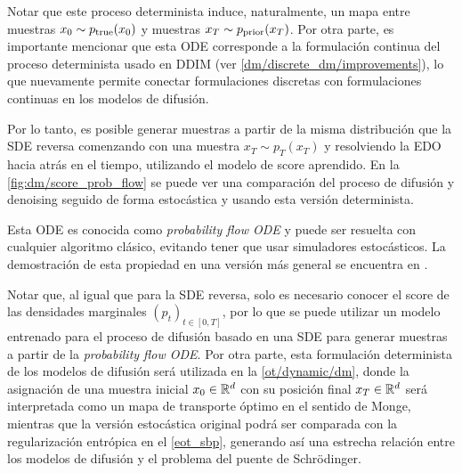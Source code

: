 Notar que este proceso determinista induce, naturalmente, un mapa  entre muestras $x_0\sim p_{\operatorname{true}}(x_0)$ y muestras $x_T\sim p_{\operatorname{prior}}(x_T)$. Por otra parte, es importante mencionar que esta ODE corresponde a la formulación continua del proceso determinista usado en DDIM (ver \autoref{dm/discrete_dm/improvements}), lo que nuevamente permite conectar formulaciones discretas con formulaciones continuas en los modelos de difusión.

Por lo tanto, es posible generar muestras a partir de la misma distribución que la SDE reversa comenzando con una muestra $x_T\sim p_T(x_T)$ y resolviendo la EDO hacia atrás en el tiempo, utilizando el modelo de score aprendido. En la \autoref{fig:dm/score_prob_flow} se puede ver una comparación del proceso de difusión y denoising seguido de forma estocástica y usando esta versión determinista.


Esta ODE es conocida como \textit{probability flow ODE} y puede ser resuelta con cualquier algoritmo clásico, evitando tener que usar simuladores estocásticos. La demostración de esta propiedad en una versión más general se encuentra en \cite{song2021scorebased}.

Notar que, al igual que para la SDE reversa, solo es necesario conocer el score de las densidades marginales $(p_t)_{t\in[0,T]}$, por lo que se puede utilizar un modelo entrenado para el proceso de difusión basado en una SDE para generar muestras a partir de la \textit{probability flow ODE}. Por otra parte, esta formulación determinista de los modelos de difusión será utilizada en la \autoref{ot/dynamic/dm}, donde la asignación de una muestra inicial $x_0\in\mathbb{R}^d$ con su posición final $x_T\in\mathbb{R}^d$ será interpretada como un mapa de transporte óptimo en el sentido de Monge, mientras que la versión estocástica original podrá ser comparada con la regularización entrópica en el \autoref{eot_sbp}, generando así una estrecha relación entre los modelos de difusión y el problema del puente de Schrödinger.


